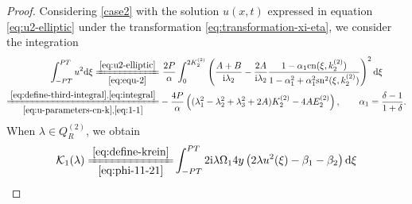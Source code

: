\documentclass[11pt,reqno]{amsart}
\newcommand{\ii}{\mathrm{i}}
\newcommand{\sn}{\mathrm{sn}}
\newcommand{\cn}{\mathrm{cn}}
\newcommand{\dd}{\mathrm{d}}
\numberwithin{equation}{section}
\begin{document}
\begin{proof}
Considering \ref{case2} with the solution $u(x,t)$ expressed in equation \eqref{eq:u2-elliptic} under the transformation \eqref{eq:transformation-xi-eta},
we consider the integration 
\begin{equation}\label{eq:u2-solution-int}
	\begin{split}
		\int_{-PT}^{PT} u^2 \dd \xi 
		\xlongequal[\eqref{eq:equ-2}]{\eqref{eq:u2-elliptic}}
		&\ \frac{2P}{\alpha}\int_{0}^{2  K^{(2)}_2} \left(\frac{A+B}{\ii \lambda_2}-\frac{2A}{\ii \lambda_2}\frac{1-\alpha_1\cn(\xi,  k^{(2)}_2)}{1-\alpha_1^2+\alpha_1^2\sn^2( \xi,  k^{(2)}_2)}\right)^2 \dd \xi \\
		\xlongequal[\eqref{eq:u-parameters-cn-k},\eqref{eq:1-1}]{\eqref{eq:define-third-integral},\eqref{eq:integral}}
		& -\frac{4P}{\alpha}\left((\lambda_1^2-\lambda_2^2+\lambda_3^2+2A)  K^{(2)}_2-4A E^{(2)}_2\right), \qquad \alpha_1=\frac{\delta-1}{1+\delta}.
	\end{split}
\end{equation}
When $\lambda\in  Q^{(2)} _{R}$, we obtain 
\begin{equation}\nonumber
	\begin{split}
		\mathcal{K}_1(\lambda)
		\xlongequal[\eqref{eq:phi-11-21}]{\eqref{eq:define-krein}}&\int_{-PT}^{PT}2\ii \lambda \Omega_1 4y\left(2\lambda u^2(\xi)-\beta_1-\beta_2\right)\dd \xi\\

\end{split}
\end{equation}
\end{proof}
\end{document}
